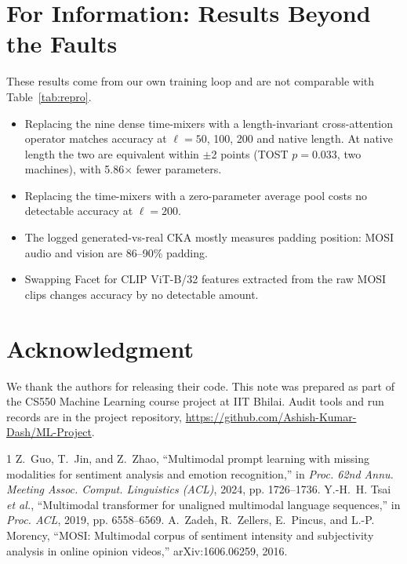 \documentclass[lettersize,journal]{IEEEtran}
\begin{document}
\section{For Information: Results Beyond the Faults}
These results come from our own training loop and are not comparable with Table~\ref{tab:repro}.
\begin{itemize}
\item Replacing the nine dense time-mixers with a length-invariant cross-attention operator matches accuracy at $\ell=50$, 100, 200 and native length. At native length the two are equivalent within $\pm$2 points (TOST $p=0.033$, two machines), with 5.86$\times$ fewer parameters.
\item Replacing the time-mixers with a zero-parameter average pool costs no detectable accuracy at $\ell=200$.
\item The logged generated-vs-real CKA mostly measures padding position: MOSI audio and vision are 86--90\% padding.
\item Swapping Facet for CLIP ViT-B/32 features extracted from the raw MOSI clips changes accuracy by no detectable amount.
\end{itemize}

\section*{Acknowledgment}
We thank the authors for releasing their code. This note was prepared as part of the CS550 Machine Learning course project at IIT Bhilai. Audit tools and run records are in the project repository, \url{https://github.com/Ashish-Kumar-Dash/ML-Project}.

\begin{thebibliography}{1}
Z.~Guo, T.~Jin, and Z.~Zhao, ``Multimodal prompt learning with missing modalities for sentiment analysis and emotion recognition,'' in \emph{Proc. 62nd Annu. Meeting Assoc. Comput. Linguistics (ACL)}, 2024, pp. 1726--1736.
Y.-H.~H. Tsai \emph{et al.}, ``Multimodal transformer for unaligned multimodal language sequences,'' in \emph{Proc. ACL}, 2019, pp. 6558--6569.
A.~Zadeh, R.~Zellers, E.~Pincus, and L.-P. Morency, ``MOSI: Multimodal corpus of sentiment intensity and subjectivity analysis in online opinion videos,'' arXiv:1606.06259, 2016.
\end{thebibliography}
\end{document}

